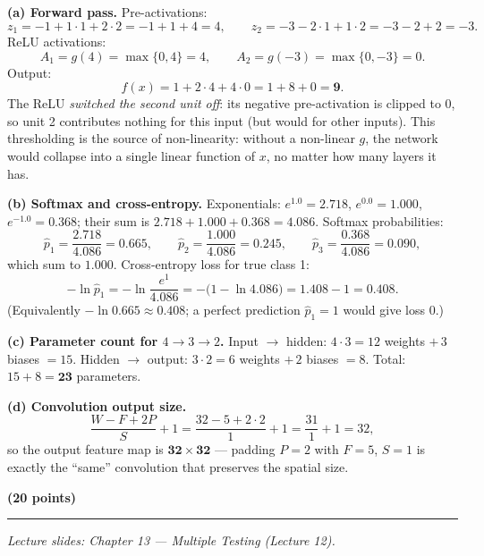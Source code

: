 \documentclass[11pt,a4paper]{article}
\newcommand{\problem}[2]{\par\vspace{7mm}\noindent{\large\textbf{Problem #1}}%
  \hfill{\large\textbf{(#2 points)}}\par\nopagebreak\vspace{0.6mm}%
  \noindent\rule{\textwidth}{0.6pt}\par\nopagebreak\vspace{2.5mm}}
\begin{document}
\ifdefined\withsolutions
\begin{solutionbox}
\textbf{(a) Forward pass.}
Pre-activations:
\[
  z_1=-1+1\cdot 1+2\cdot 2=-1+1+4=4,\qquad
  z_2=-3-2\cdot 1+1\cdot 2=-3-2+2=-3 .
\]
ReLU activations:
\[
  A_1=g(4)=\max\{0,4\}=4,\qquad A_2=g(-3)=\max\{0,-3\}=0 .
\]
Output:
\[
  f(x)=1+2\cdot 4+4\cdot 0=1+8+0=\mathbf{9}.
\]
The ReLU \emph{switched the second unit off}: its negative pre-activation is clipped to $0$,
so unit 2 contributes nothing for this input (but would for other inputs). This thresholding
is the source of non-linearity: without a non-linear $g$, the network would collapse into a
single linear function of $x$, no matter how many layers it has.

\medskip
\textbf{(b) Softmax and cross-entropy.}
Exponentials: $e^{1.0}=2.718$, $e^{0.0}=1.000$, $e^{-1.0}=0.368$; their sum is
$2.718+1.000+0.368=4.086$. Softmax probabilities:
\[
  \hat{p}_1=\frac{2.718}{4.086}=0.665,\qquad
  \hat{p}_2=\frac{1.000}{4.086}=0.245,\qquad
  \hat{p}_3=\frac{0.368}{4.086}=0.090,
\]
which sum to $1.000$. Cross-entropy loss for true class 1:
\[
  -\ln\hat{p}_1=-\ln\frac{e^{1}}{4.086}=-\bigl(1-\ln 4.086\bigr)=1.408-1=\mathbf{0.408}.
\]
(Equivalently $-\ln 0.665\approx 0.408$; a perfect prediction $\hat{p}_1=1$ would give loss 0.)

\medskip
\textbf{(c) Parameter count for $4\to 3\to 2$.}
Input $\to$ hidden: $4\cdot 3=12$ weights $+\,3$ biases $=15$.
Hidden $\to$ output: $3\cdot 2=6$ weights $+\,2$ biases $=8$.
Total: $15+8=\mathbf{23}$ parameters.

\medskip
\textbf{(d) Convolution output size.}
\[
  \frac{W-F+2P}{S}+1=\frac{32-5+2\cdot 2}{1}+1=\frac{31}{1}+1=32,
\]
so the output feature map is $\mathbf{32\times 32}$ --- padding $P=2$ with $F=5$, $S=1$ is
exactly the ``same'' convolution that preserves the spatial size.
\end{solutionbox}
\fi

\problem{6: Multiple testing}{20}
{\small\itshape Lecture slides: Chapter 13 --- Multiple Testing (Lecture 12).}\par\vspace{1mm}
\end{document}
